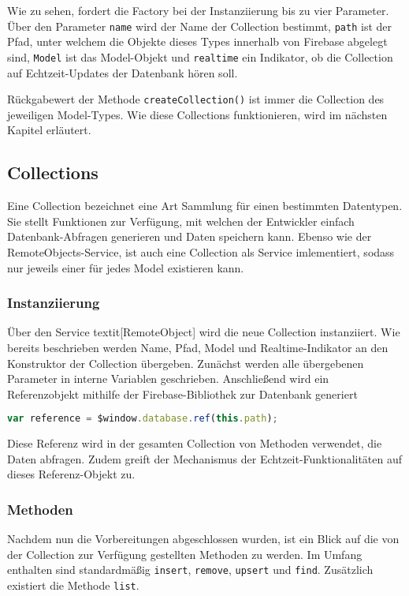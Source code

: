 Wie zu sehen, fordert die Factory bei der Instanziierung bis zu vier Parameter. Über den Parameter \texttt{name} wird der Name der Collection bestimmt, \texttt{path} ist der Pfad,
unter welchem die Objekte dieses Types innerhalb von Firebase abgelegt sind, \texttt{Model} ist das Model-Objekt und \texttt{realtime} ein Indikator,
ob die Collection auf Echtzeit-Updates der Datenbank hören soll.

Rückgabewert der Methode \texttt{createCollection()} ist immer die Collection des jeweiligen Model-Types.
Wie diese Collections funktionieren, wird im nächsten Kapitel erläutert.

\subsection{Collections}

Eine Collection bezeichnet eine Art Sammlung für einen bestimmten Datentypen. Sie stellt Funktionen zur Verfügung, mit welchen der Entwickler einfach Datenbank-Abfragen generieren und Daten speichern kann.
Ebenso wie der RemoteObjects-Service, ist auch eine Collection als Service imlementiert, sodass nur jeweils einer für jedes Model existieren kann.

\subsubsection{Instanziierung}
Über den Service textit[RemoteObject] wird die neue Collection instanziiert. Wie bereits beschrieben werden Name, Pfad, Model und Realtime-Indikator an den Konstruktor der Collection übergeben.
Zunächst werden alle übergebenen Parameter in interne Variablen geschrieben.
Anschließend wird ein Referenzobjekt mithilfe der Firebase-Bibliothek zur Datenbank generiert

 \begin{lstlisting}[language=Javascript, label=code_CollectionReference, caption=Befehl zum Generieren einer Firebase-Referenz]
 var reference = $window.database.ref(this.path);
\end{lstlisting}

Diese Referenz wird in der gesamten Collection von Methoden verwendet, die Daten abfragen. Zudem greift der Mechanismus der Echtzeit-Funktionalitäten auf dieses Referenz-Objekt zu.

\subsubsection{Methoden}
Nachdem nun die Vorbereitungen abgeschlossen wurden, ist ein Blick auf die von der Collection zur Verfügung gestellten Methoden zu werden.
Im Umfang enthalten sind standardmäßig \texttt{insert}, \texttt{remove}, \texttt{upsert} und \texttt{find}. Zusätzlich existiert die Methode \texttt{list}.

